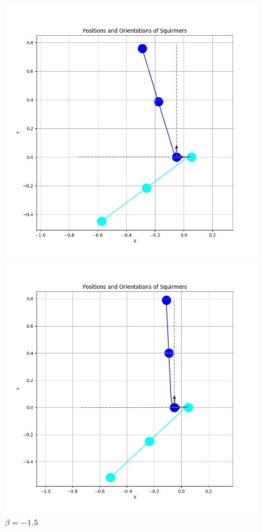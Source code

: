 \documentclass{article}
\begin{document}
\begin{figure}
    \centering
    \begin{minipage}{0.49\textwidth}
        \includegraphics[width=1.1\textwidth]{graphs/simulations/sim_sq_sq/betam1_5/pi_.png}
        \caption{\footnotesize $\beta = -1.5$}
    \end{minipage}\hfill
    \begin{minipage}{0.49\textwidth}
        \includegraphics[width=1.1\textwidth]{graphs/simulations/sim_sq_sq/betam3/pi_.png}

\end{minipage}
\end{figure}
\end{document}
